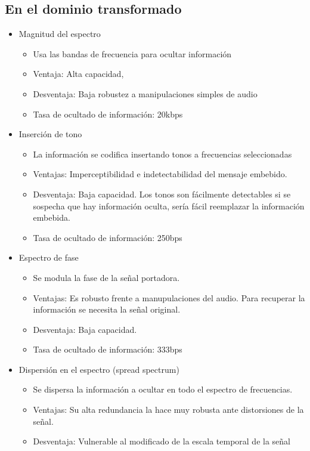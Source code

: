 \documentclass[conference,a4paper,10pt, oneside,final]{tfmpd}
\begin{document}
\subsection{En el dominio transformado}
\begin{itemize}
 \item Magnitud del espectro
   \begin{itemize}
 \item Usa las bandas de frecuencia para ocultar información
 \item Ventaja: Alta capacidad, 
 \item Desventaja: Baja robustez a manipulaciones simples de audio
 \item Tasa de ocultado de información: 20kbps
 \end{itemize}
 \item Inserción de tono
 \begin{itemize}
 \item La información se codifica insertando tonos a frecuencias seleccionadas
 \item Ventajas: Imperceptibilidad e indetectabilidad del mensaje embebido.
 \item Desventaja: Baja capacidad. Los tonos son fácilmente detectables si se sospecha que hay información oculta, sería fácil reemplazar la información embebida.
 \item Tasa de ocultado de información: 250bps
 \end{itemize}
 \item Espectro de fase
 \begin{itemize}
 \item Se modula la fase de la señal portadora.
 \item Ventajas: Es robusto frente a manupulaciones del audio. Para recuperar la información se necesita la señal original.
 \item Desventaja: Baja capacidad.
 \item Tasa de ocultado de información: 333bps
 \end{itemize}
 \item Dispersión en el espectro (spread spectrum)
  \begin{itemize}
 \item Se dispersa la información a ocultar en todo el espectro de frecuencias.
 \item Ventajas: Su alta redundancia la hace muy robusta ante distorsiones de la señal.
 \item Desventaja: Vulnerable al modificado de la escala temporal de la señal

\end{itemize}
\end{itemize}
\end{document}
